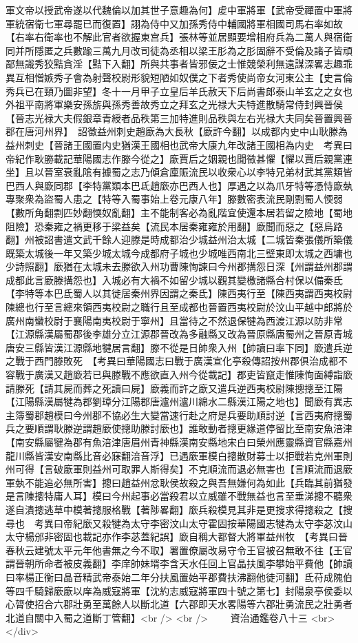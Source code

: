 軍文帝以授武帝遂以代魏倫以加其世子意趣為何】䖍中軍將軍【武帝受禪置中軍將軍統宿衛七軍尋罷已而復置】詡為侍中又加孫秀侍中輔國將軍相國司馬右率如故【右率右衛率也不解此官者欲握東宫兵】張林等並居顯要增相府兵為二萬人與宿衛同并所隱匿之兵數踰三萬九月改司徒為丞相以梁王肜為之肜固辭不受倫及諸子皆頑鄙無識秀狡黠貪淫【黠下入翻】所與共事者皆邪佞之士惟競榮利無遠謀深畧志趣乖異互相憎嫉秀子會為射聲校尉形貌短陋如奴僕之下者秀使尚帝女河東公主【史言倫秀兵已在頸乃圖非望】冬十一月甲子立皇后羊氏赦天下后尚書郎泰山羊玄之之女也外祖平南將軍樂安孫旂與孫秀善故秀立之拜玄之光禄大夫特進散騎常侍封興晉侯【晉志光禄大夫假銀章青綬者品秩第三加特進則品秩與左右光禄大夫同矣晉置興晉郡在唐河州界】　詔徵益州刺史趙廞為大長秋【廞許今翻】以成都内史中山耿滕為益州刺史【晉諸王國置内史猶漢王國相也武帝大康九年改諸王國相為内史　考異曰帝紀作耿勝載記華陽國志作滕今從之】廞賈后之姻親也聞徵甚懼【懼以賈后親黨連坐】且以晉室衰亂隂有據蜀之志乃傾倉廩賑流民以收衆心以李特兄弟材武其黨類皆巴西人與廞同郡【李特黨類本巴氐趙廞亦巴西人也】厚遇之以為爪牙特等憑恃廞埶專聚衆為盜蜀人患之【特等入蜀事始上卷元康八年】滕數密表流民剛剽蜀人愞弱【數所角翻剽匹妙翻愞奴亂翻】主不能制客必為亂階宜使還本居若留之險地【蜀地阻險】恐秦雍之禍更移于梁益矣【流民本居秦雍雍於用翻】廞聞而惡之【惡烏路翻】州被詔書遣文武千餘人迎滕是時成都治少城益州治太城【二城皆秦張儀所築儀既築太城後一年又築少城太城今成都府子城也少城唯西南北三壁東即太城之西墉也少詩照翻】廞猶在太城未去滕欲入州功曹陳恂諫曰今州郡搆怨日深【州謂益州郡謂成都此言廞滕搆怨也】入城必有大禍不如留少城以觀其變檄諸縣合村保以備秦氐【李特等本巴氐蜀人以其徙居秦州界因謂之秦氐】陳西夷行至【陳西夷謂西夷校尉陳總也行至言總來領西夷校尉之職行且至成都也晉置西夷校尉於汶山平越中郎將於廣州南蠻校尉于襄陽南夷校尉于寧州】且當待之不然退保犍為西渡江源以防非常【江源縣漢屬蜀郡後李雄分立江源郡晉改為多融縣又改為晉原縣唐蜀州之晉原青城唐安三縣皆漢江源縣地犍居言翻】滕不從是日帥衆入州【帥讀曰率下同】廞遣兵逆之戰于西門滕敗死　【考異曰華陽國志曰戰于廣漢宣化亭殺傳詔按州郡俱治成都不容戰于廣漢又趙廞若已與滕戰不應欲直入州今從載記】郡吏皆竄走惟陳恂面縛詣廞請滕死【請其屍而葬之死讀曰屍】廞義而許之廞又遣兵逆西夷校尉陳摠摠至江陽【江陽縣漢屬犍為郡劉璋分江陽郡唐瀘州瀘川綿水二縣漢江陽之地也】聞廞有異志主簿蜀郡趙模曰今州郡不協必生大變當速行赴之府是兵要助順討逆【言西夷府摠蜀兵之要順謂耿滕逆謂趙廞使摠助滕討廞也】誰敢動者摠更緣道停留比至南安魚涪津【南安縣屬犍為郡有魚涪津唐眉州青神縣漢南安縣地宋白曰榮州應靈縣資官縣嘉州龍川縣皆漢安南縣比音必寐翻涪音浮】已遇廞軍模白摠散財募士以拒戰若克州軍則州可得【言破廞軍則益州可取罪人斯得矣】不克順流而退必無害也【言順流而退廞軍埶不能追必無所害】摠曰趙益州忿耿侯故殺之與吾無嫌何為如此【兵臨其前猶發是言陳摠特庸人耳】模曰今州起事必當殺君以立威雖不戰無益也言至垂涕摠不聽衆遂自潰摠逃草中模著摠服格戰【著陟畧翻】廞兵殺模見其非是更搜求得摠殺之【搜尋也　考異曰帝紀廞又殺犍為太守李密汶山太守霍固按華陽國志犍為太守李苾汶山太守楊邠非密固也載記亦作李苾蓋紀誤】廞自稱大都督大將軍益州牧　【考異曰晉春秋云建號太平元年他書無之今不取】署置僚屬改易守令王官被召無敢不往【王官謂晉朝所命者被皮義翻】李庠帥妹壻李含天水任回上官晶扶風李攀始平費他【帥讀曰率楊正衡曰晶音精武帝泰始二年分扶風置始平郡費扶沸翻他徒河翻】氐苻成隗伯等四千騎歸廞廞以庠為威寇將軍【沈約志威寇將軍四十號之第七】封陽泉亭侯委以心膂使招合六郡壯勇至萬餘人以斷北道【六郡即天水畧陽等六郡壯勇流民之壯勇者北道自關中入蜀之道斷丁管翻】<br />
<br />
　　資治通鑑卷八十三  <br>
   </div> 

